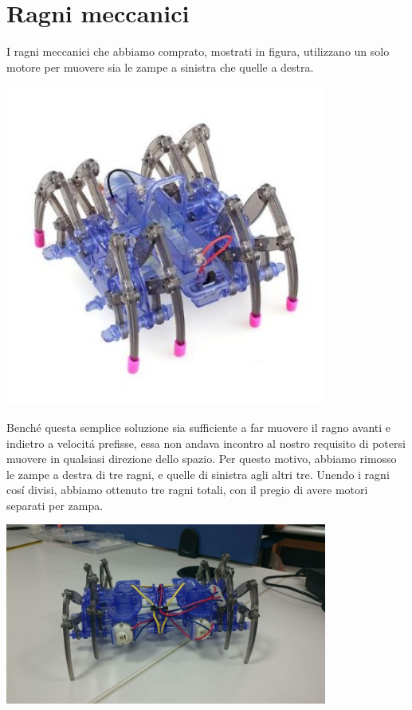 \documentclass [11pt ,a4paper ,twoside ]{report}
\begin{document}
\section{Ragni meccanici}

I ragni meccanici che abbiamo comprato, mostrati in figura, utilizzano un solo motore per muovere sia le zampe a sinistra che quelle a destra. 
\begin{center}
\includegraphics[keepaspectratio, width=300pt]{Images/single_spider2.png}
\end{center}
Bench\'e questa semplice soluzione sia sufficiente a far muovere il ragno avanti e indietro a velocit\'a prefisse, essa non andava incontro al nostro requisito di potersi muovere in qualsiasi direzione dello spazio. Per questo motivo, abbiamo rimosso le zampe a destra di tre ragni, e quelle di sinistra agli altri tre. Unendo i ragni cos\'i divisi, abbiamo ottenuto tre ragni totali, con il pregio di avere motori separati per zampa.
\begin{center}
\includegraphics[keepaspectratio, width=300pt]{Images/double_spider.png}
\end{center}
\end{document}
